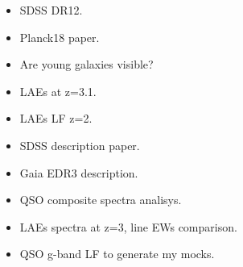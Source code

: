 \documentclass[a4paper,fleqn,usenatbib]{mnras}
\begin{document}
\begin{itemize}
    \item SDSS DR12. \cite{Alam2015}
    \item Planck18 paper. \cite{Planck18}
    \item Are young galaxies visible? \cite{Partridge1967}
    \item LAEs at z=3.1. \cite{Gronwall2007}
    \item LAEs LF z=2. \cite{Sobral2017}
    \item SDSS description paper. \cite{York2000}
    \item Gaia EDR3 description. \cite{Brown2021}
    \item QSO composite spectra analisys. \cite{VandenBerk2001}
    \item LAEs spectra at z=3, line EWs comparison. \cite{Nakajima2018}
    \item QSO g-band LF to generate my mocks. \cite{Palanque-Delabrouille2016}
\end{itemize}













\bsp	%
\label{lastpage}
\end{document}
